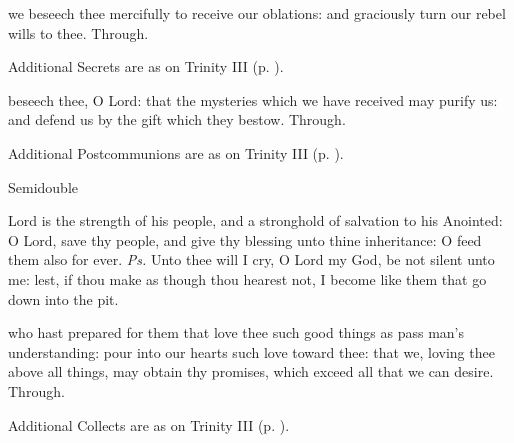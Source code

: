 
\secret
{} we beseech thee mercifully to receive our oblations: and graciously turn our rebel wills to thee. Through.

\begin{rubric}
    Additional Secrets are as on Trinity III (p. \pageref{TrinityIII}).
\end{rubric}


\postcommunion
{} beseech thee, O Lord: that the mysteries which we have received may purify us: and defend us by the gift which they bestow. Through.
\begin{rubric}
    Additional Postcommunions are as on Trinity III (p. \pageref{TrinityIII}).
\end{rubric}

\begin{inhead}
    {Semidouble}
\end{inhead}
\par\noindent
{}



\introit
{} Lord is the strength of his people, and a stronghold of salvation to his Anointed: O Lord, save thy people, and give thy blessing unto thine inheritance: O feed them also for ever. \textit{Ps.} Unto thee will I cry, O Lord my God, be not silent unto me: lest, if thou make as though thou hearest not, I become like them that go down into the pit.

\collect
{} who hast prepared for them that love thee such good things as pass man's understanding: pour into our hearts such love toward thee: that we, loving thee above all things, may obtain thy promises, which exceed all that we can desire. Through.
\begin{rubric}
    Additional Collects are as on Trinity III (p. \pageref{TrinityIII}).
\end{rubric}


